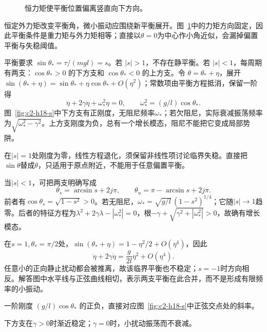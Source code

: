 \begin{figure}[H]\centering
{}
\caption{恒力矩使平衡位置偏离竖直向下方向。}\label{fig:c2-h18-q}
\end{figure}
\begin{solution}
恒定外力矩改变平衡角，微小振动应围绕新平衡展开。图~\ref{fig:c2-h18-q}中的力矩方向固定，因此平衡条件是重力矩与外力矩相等；直接以$\theta=0$为中心作小角近似，会漏掉偏置平衡与失稳阈值。


平衡要求 $\sin\theta_*=\tau/(mgl)=s$。若 $|s|>1$，不存在静平衡。若 $|s|<1$，每周期有两支：$\cos\theta_*>0$ 的下方支和 $\cos\theta_*<0$ 的上方支。令 $\theta=\theta_*+\eta$，展开 $\sin(\theta_*+\eta)=\sin\theta_*+\eta\cos\theta_*+O(\eta^2)$；常数项由平衡方程抵消，保留一阶得
\[\ddot\eta+2\gamma\dot\eta+\omega_*^2\eta=0,
\qquad \boxed{\omega_*^2=(g/l)\cos\theta_*}.\]
图~\ref{fig:c2-h18-s}中下方支有正刚度，无阻尼频率$\omega_*$；若欠阻尼，实际衰减振荡频率为$\sqrt{\omega_*^2-\gamma^2}$。上方支刚度为负，总有一个增长模态，阻尼不能把它变成局部势阱。

在$|s|=1$处刚度为零，线性方程退化，须保留非线性项讨论临界失稳。直接把$\sin\theta$替成$\theta$，只适用于原点附近，不能用于任意偏置平衡。


当$|s|<1$，可把两支明确写成
\[\theta_s=\arcsin s+2j\pi,\qquad
\theta_u=\pi-\arcsin s+2j\pi.\]
前者有$\cos\theta_s=\sqrt{1-s^2}>0$。若无阻尼，$\omega_* =\sqrt{g/l}\,(1-s^2)^{1/4}$；它随$|s|\to1$趋零。后者的特征方程为$\lambda^2+2\gamma\lambda-|\omega_*^2|=0$，根$-\gamma+\sqrt{\gamma^2+|\omega_*^2|}>0$，故确有增长模态。

在$s=1,\theta_*=\pi/2$处，$\sin(\theta_*+\eta)=1-\eta^2/2+O(\eta^4)$，因此
\[\ddot\eta+2\gamma\dot\eta=\frac g{2l}\eta^2+O(\eta^4).\]
任意小的正向静止扰动都会被推离，故该临界平衡也不稳定；$s=-1$时方向相反。解答图中水平线与正弦曲线相切，表示两支平衡在此合并，而不是形成有限频率的小振动。

一阶刚度 $(g/l)\cos\theta_*$ 的正负，直接对应图~\ref{fig:c2-h18-s}中正弦交点处的斜率。

下方支在$\gamma>0$时渐近稳定；$\gamma=0$时，小扰动振荡而不衰减。


\end{solution}
